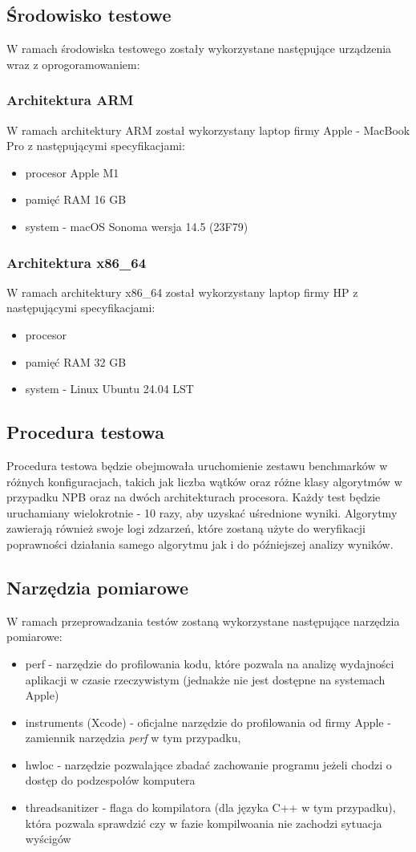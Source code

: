\subsection{Środowisko testowe}
W ramach środowiska testowego zostały wykorzystane następujące urządzenia wraz z oprogoramowaniem:
\subsubsection{Architektura ARM}
W ramach architektury ARM został wykorzystany laptop firmy Apple - MacBook Pro z następującymi specyfikacjami:
\begin{itemize}
    \item procesor Apple M1
    \item pamięć RAM 16 GB
    \item system - macOS Sonoma wersja 14.5 (23F79)
\end{itemize}
\subsubsection{Architektura x86\_64}
W ramach architektury x86\_64 został wykorzystany laptop firmy HP z następującymi specyfikacjami:
\begin{itemize}
    \item procesor
    \item pamięć RAM 32 GB
    \item system - Linux Ubuntu 24.04 LST
\end{itemize}
\subsection{Procedura testowa}
Procedura testowa będzie obejmowała uruchomienie zestawu benchmarków w różnych konfiguracjach, takich jak liczba wątków oraz różne klasy algorytmów w przypadku NPB oraz na dwóch architekturach procesora. Każdy test będzie uruchamiany wielokrotnie - 10 razy, aby uzyskać uśrednione wyniki. Algorytmy zawierają również swoje logi zdzarzeń, które zostaną użyte do weryfikacji poprawności działania samego algorytmu jak i do późniejszej analizy wyników.
\subsection{Narzędzia pomiarowe}
W ramach przeprowadzania testów zostaną wykorzystane następujące narzędzia pomiarowe:
\begin{itemize}
    \item perf - narzędzie do profilowania kodu, które pozwala na analizę wydajności aplikacji w czasie rzeczywistym (jednakże nie jest dostępne na systemach Apple)
    \item instruments (Xcode) - oficjalne narzędzie do profilowania od firmy Apple - zamiennik narzędzia \textit{perf} w tym przypadku,
    \item hwloc - narzędzie pozwalające zbadać zachowanie programu jeżeli chodzi o dostęp do podzespołów komputera
    \item threadsanitizer - flaga do kompilatora (dla języka C++ w tym przypadku), która pozwala sprawdzić czy w fazie kompilwoania nie zachodzi sytuacja wyścigów
\end{itemize}

